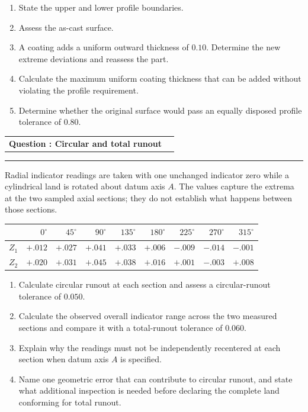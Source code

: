 \documentclass[11pt,a4paper]{article}
\makeatletter
\newcommand{\leveltag}[1]{%
  \fcolorbox{navy}{softgray}{\strut\small\bfseries\color{navy}#1}%
}
\newcommand{\qhead}[2]{%
  \clearpage
  \noindent\begin{tabularx}{\linewidth}{@{}Xr@{}}
  {\Large\bfseries\color{navy}Question \thequestion: #1} & \leveltag{#2}
  \end{tabularx}\par\vspace{-1mm}
  \noindent\rule{\linewidth}{0.6pt}\par\vspace{1mm}
}
\newcounter{question}
\newcommand{\question}[2]{\stepcounter{question}\qhead{#1}{#2}}
\makeatother
\begin{document}
\begin{enumerate}[label=(\alph*)]
\item State the upper and lower profile boundaries.
\item Assess the as-cast surface.
\item A coating adds a uniform outward thickness of $0.10$. Determine the new extreme deviations and reassess the part.
\item Calculate the maximum uniform coating thickness that can be added without violating the profile requirement.
\item Determine whether the original surface would pass an equally disposed profile tolerance of $0.80$.
\end{enumerate}

\question{Circular and total runout}{Level I}

Radial indicator readings are taken with one unchanged indicator zero while a cylindrical land is rotated about datum axis $A$. The values capture the extrema at the two sampled axial sections; they do not establish what happens between those sections.

\begin{center}
\small
\begin{tabular}{c*{8}{r}}
\toprule
 & $0^\circ$ & $45^\circ$ & $90^\circ$ & $135^\circ$ & $180^\circ$ & $225^\circ$ & $270^\circ$ & $315^\circ$\\
\midrule
$Z_1$ & $+.012$ & $+.027$ & $+.041$ & $+.033$ & $+.006$ & $-.009$ & $-.014$ & $-.001$\\
$Z_2$ & $+.020$ & $+.031$ & $+.045$ & $+.038$ & $+.016$ & $+.001$ & $-.003$ & $+.008$\\
\bottomrule
\end{tabular}
\end{center}

\begin{enumerate}[label=(\alph*)]
\item Calculate circular runout at each section and assess a circular-runout tolerance of $0.050$.
\item Calculate the observed overall indicator range across the two measured sections and compare it with a total-runout tolerance of $0.060$.
\item Explain why the readings must not be independently recentered at each section when datum axis $A$ is specified.
\item Name one geometric error that can contribute to circular runout, and state what additional inspection is needed before declaring the complete land conforming for total runout.
\end{enumerate}
\end{document}

